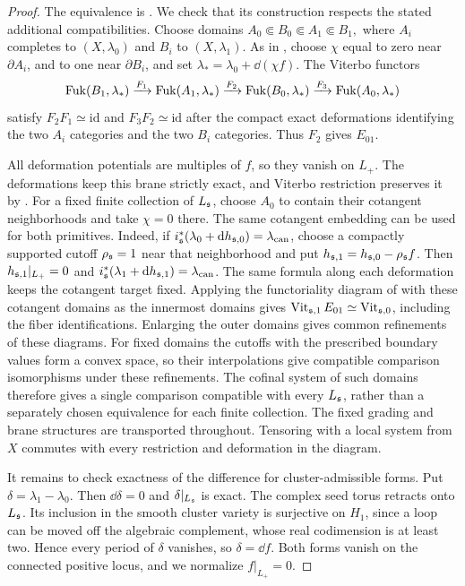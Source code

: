\documentclass[12pt, letter]{amsart}
\theoremstyle{definition}
\DeclareMathOperator{\Vit}{Vit}
\numberwithin{equation}{section}
\begin{document}
\begin{proof}
The equivalence is \cite[Theorem~1.1]{HSinv}. We check that its construction respects the stated additional
compatibilities.
Choose domains
$
 A_0\Subset B_0\Subset A_1\Subset B_1,
$
where $A_i$ completes to $(X,\lambda_0)$ and $B_i$ to
$(X,\lambda_1)$. As in \cite[Section~3]{HSinv}, choose $\chi$ equal
to zero near $\partial A_i$, and to one near $\partial B_i$, and set
$\lambda_* =\lambda_0+\dd(\chi f)$.
The Viterbo functors
\[
 \operatorname{Fuk}(B_1,\lambda_*)\xrightarrow{F_1}
 \operatorname{Fuk}(A_1,\lambda_*)\xrightarrow{F_2}
 \operatorname{Fuk}(B_0,\lambda_*)\xrightarrow{F_3}
 \operatorname{Fuk}(A_0,\lambda_*)
\]
satisfy $F_2F_1\simeq\mathrm{id}$ and
$F_3F_2\simeq\mathrm{id}$ after the compact exact deformations
identifying the two $A_i$ categories and the two $B_i$ categories.
Thus $F_2$ gives $E_{01}$.

All deformation potentials are multiples of $f$, so they vanish on
$L_+$. The deformations keep this brane strictly exact, and Viterbo
restriction preserves it by \cite[Lemma~5.8]{HS}.
For a fixed finite collection of $L_{\mathfrak{s}}$, choose $A_0$ to contain their
cotangent neighborhoods and take $\chi=0$ there.
The same cotangent embedding can be used for both primitives.
Indeed, if $i_{\mathfrak{s}}^*(\lambda_0+\mathrm{d} h_{\mathfrak{s},0})=\lambda_{\mathrm{can}}$,
choose a compactly supported cutoff $\rho_{\mathfrak{s}}=1$ near that neighborhood and put
$ h_{\mathfrak{s},1}=h_{\mathfrak{s},0}-\rho_{\mathfrak{s}} f$.
Then $h_{\mathfrak{s},1}|_{L_+}=0$ and
$i_{\mathfrak{s}}^*(\lambda_1+\mathrm{d} h_{\mathfrak{s},1})=\lambda_{\mathrm{can}}$.
The same formula along each deformation keeps the cotangent target fixed.
Applying the functoriality diagram of \cite[Section~2]{HSinv} with these
cotangent domains as the innermost domains gives
$\Vit_{\fs,1}E_{01}\simeq\Vit_{\fs,0}$, including the fiber identifications.
Enlarging the outer domains gives common refinements of these diagrams.
For fixed domains the cutoffs with the prescribed boundary values form
a convex space, so their interpolations give compatible comparison
isomorphisms under these refinements.
The cofinal system of such domains therefore gives a single comparison
compatible with every $L_{\mathfrak{s}}$, rather than a separately chosen equivalence
for each finite collection. The fixed grading and brane structures are
transported throughout. Tensoring with a local system from $X$ commutes
with every restriction and deformation in the diagram.

It remains to check exactness of the difference for cluster-admissible
forms. Put $\delta=\lambda_1-\lambda_0$. Then $\dd\delta=0$ and
$\delta|_{L_{\mathfrak{s}}}$ is exact. The complex seed torus retracts onto $L_{\mathfrak{s}}$.
Its inclusion in the smooth cluster variety is surjective on $H_1$,
since a loop can be moved off the algebraic complement, whose real
codimension is at least two. Hence every period of $\delta$ vanishes,
so $\delta=\dd f$. Both forms vanish on the connected positive locus,
and we normalize $f|_{L_+}=0$.
\end{proof}
\end{document}
